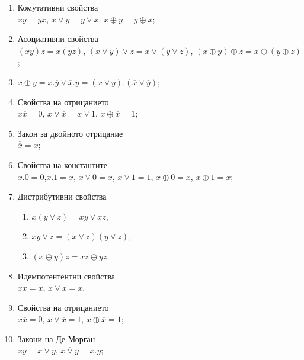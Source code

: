 \documentclass[a4paper]{article}
\newcommand{\ov}[1]{\overline{#1}}
\begin{document}
\author{Stefan Vatev}

\begin{enumerate}[1)]%
\item
  Комутативни свойства\\
  $xy = yx$, $x\vee y = y\vee x$, $x\oplus y = y\oplus x$;
\item
  Асоциативни свойства\\
  $(xy)z = x(yz)$, $(x\vee y)\vee z = x\vee (y\vee z)$, $(x\oplus y)\oplus z = x\oplus (y\oplus z)$;
\item
  $x\oplus y = x.\ov{y}\vee \ov{x}.y = (x\vee y).(\ov{x}\vee\ov{y})$;
\item
  Свойства на отрицанието\\
  $x\ov{x} = 0$, $x\vee\ov{x} = x\vee 1$, $x\oplus\ov{x} = 1$;
\item
  Закон за двойното отрицание\\
  $\ov{\ov{x}} = x$;
\item
  Свойства на константите\\
  $x.0 = 0$,$x.1 = x$, $x\vee 0 = x$, $x\vee 1 = 1$, $x\oplus 0 = x$, $x\oplus 1 = \ov{x}$;
\item
  Дистрибутивни свойства
  \begin{enumerate}[]
  \item
    $x(y\vee z) = xy \vee xz$,
  \item
    $xy \vee z = (x\vee z)(y\vee z)$,
  \item
    $(x\oplus y)z = xz \oplus yz$.
  \end{enumerate}
\item
  Идемпотентентни свойства\\
  $xx = x$, $x\vee x = x$.
\item
  Свойства на отрицанието\\
  $x\ov{x} = 0$, $x\vee\ov{x} = 1$, $x\oplus\ov{x} = 1$;
\item
  Закони на Де Морган\\
  $\ov{xy} = \ov{x}\vee\ov{y}$, $\ov{x\vee y} = \ov{x}.\ov{y}$;
\end{enumerate}
\end{document}
